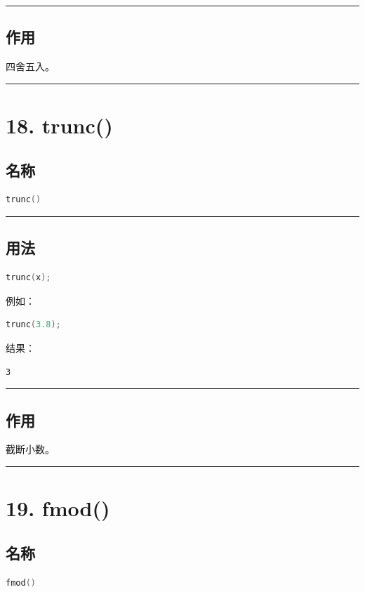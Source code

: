 \documentclass[9pt,twocolumn]{extarticle}
\begin{document}
\noindent\rule{\linewidth}{0.4pt}

\subsection{作用}
四舍五入。

\noindent\rule{\linewidth}{0.4pt}

\section{18. trunc()}

\subsection{名称}
\begin{lstlisting}[language=C++]
trunc()
\end{lstlisting}

\noindent\rule{\linewidth}{0.4pt}

\subsection{用法}
\begin{lstlisting}[language=C++]
trunc(x);
\end{lstlisting}
例如：
\begin{lstlisting}[language=C++]
trunc(3.8);
\end{lstlisting}
结果：
\begin{lstlisting}
3
\end{lstlisting}

\noindent\rule{\linewidth}{0.4pt}

\subsection{作用}
截断小数。

\noindent\rule{\linewidth}{0.4pt}

\section{19. fmod()}

\subsection{名称}
\begin{lstlisting}[language=C++]
fmod()
\end{lstlisting}
\end{document}
